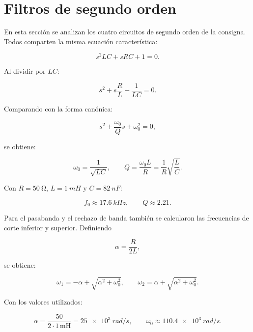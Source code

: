\section{Filtros de segundo orden}

En esta sección se analizan los cuatro circuitos de segundo orden de la consigna. Todos comparten la misma ecuación característica:

\begin{equation}
    s^2LC+sRC+1=0.
\end{equation}

Al dividir por $LC$:

\begin{equation}
    s^2+s\frac{R}{L}+\frac{1}{LC}=0.
\end{equation}

Comparando con la forma canónica:

\begin{equation}
    s^2+\frac{\omega_0}{Q}s+\omega_0^2=0,
\end{equation}

se obtiene:

\begin{equation}
    \omega_0=\frac{1}{\sqrt{LC}},
    \qquad
    Q=\frac{\omega_0 L}{R}=\frac{1}{R}\sqrt{\frac{L}{C}}.
\end{equation}

Con $R=\SI{50}{\ohm}$, $L=\SI{1}{mH}$ y $C=\SI{82}{nF}$:

\begin{equation}
    f_0\approx\SI{17.6}{kHz},
    \qquad
    Q\approx 2.21.
\end{equation}

Para el pasabanda y el rechazo de banda también se calcularon las frecuencias de corte inferior y superior. Definiendo

\begin{equation}
    \alpha=\frac{R}{2L},
\end{equation}

se obtiene:

\begin{equation}
    \omega_1=-\alpha+\sqrt{\alpha^2+\omega_0^2},
    \qquad
    \omega_2=\alpha+\sqrt{\alpha^2+\omega_0^2}.
\end{equation}

Con los valores utilizados:

\begin{equation}
    \alpha=\frac{50}{2\cdot 1\,\text{mH}}
    =\SI{25e3}{rad/s},
    \qquad
    \omega_0\approx\SI{110.4e3}{rad/s}.
\end{equation}


